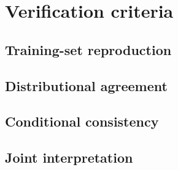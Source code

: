 \section{Verification criteria}

\subsection{Training-set reproduction}

\draftplaceholder

\subsection{Distributional agreement}

\draftplaceholder

\subsection{Conditional consistency}

\draftplaceholder

\subsection{Joint interpretation}

\draftplaceholder

